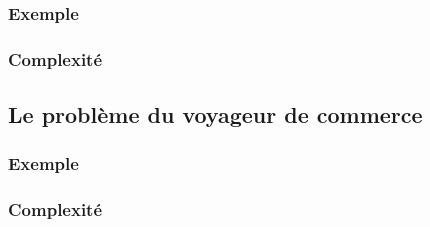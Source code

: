 \subsubsection{Exemple}

\subsubsection{Complexité}


\subsection{Le problème du voyageur de commerce}
\subsubsection{Exemple}

\subsubsection{Complexité}
